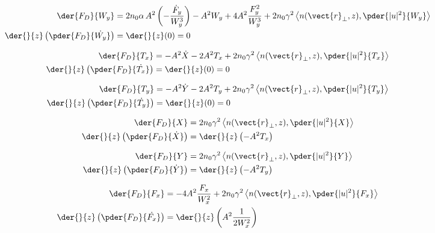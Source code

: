 \begin{equation}
\begin{split}
    \der{F_{D}}{W_y} & = 2 n_0 \alpha\, A^2 \left(  -\frac{\dot{F}_{y} }{W_{y}^3} \right)  - A^2 W_y + 4 A^2 \frac{F_{y}^2}{W_{y}^3}  + 2n_0 \gamma^2 \left<n(\vect{r}_{\perp},z), \pder{|u|^2}{W_{y}}\right>\\
\der{}{z}\left(\pder{F_{D}}{\dot{W_y}}\right) &= \der{}{z}(0) = 0 
\end{split}
\end{equation}

\begin{equation}
\begin{split}
    \der{F_{D}}{T_x} & = -A^2 \dot{X} - 2A^2 T_x  + 2n_0 \gamma^2 \left<n(\vect{r}_{\perp},z), \pder{|u|^2}{T_{x}}\right>\\
\der{}{z}\left(\pder{F_{D}}{\dot{T_x}}\right) &= \der{}{z}(0) = 0 
\end{split}
\end{equation}

\begin{equation}
\begin{split}
    \der{F_{D}}{T_y} & = -A^2 \dot{Y} - 2A^2 T_y  + 2n_0 \gamma^2 \left<n(\vect{r}_{\perp},z), \pder{|u|^2}{T_{y}}\right>\\
\der{}{z}\left(\pder{F_{D}}{\dot{T_y}}\right) &= \der{}{z}(0) = 0 
\end{split}
\end{equation}


\begin{equation}
\begin{split}
    \der{F_{D}}{X} & = 2n_0 \gamma^2 \left<n(\vect{r}_{\perp},z), \pder{|u|^2}{X}\right>\\
\der{}{z}\left(\pder{F_{D}}{\dot{X}}\right) &= \der{}{z}\left(-A^2 T_x \right)
\end{split}
\end{equation}

\begin{equation}
\begin{split}
    \der{F_{D}}{Y} & = 2n_0 \gamma^2 \left<n(\vect{r}_{\perp},z), \pder{|u|^2}{Y}\right>\\
\der{}{z}\left(\pder{F_{D}}{\dot{Y}}\right) &= \der{}{z}\left(-A^2 T_y \right)
\end{split}
\end{equation}


\begin{equation}
\begin{split}
    \der{F_{D}}{F_x}  &=  - 4 A^2 \frac{F_{x}}{W_{x}^2} + 2n_0 \gamma^2 \left<n(\vect{r}_{\perp},z),\pder{|u|^2}{F_x}\right> \\
    \der{}{z}\left(\pder{F_{D}}{\dot{F_x}}\right) &= \der{}{z}\left(A^2 \frac{1}{2W_{x}^2} \right)
\end{split}
\end{equation}

